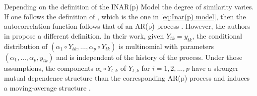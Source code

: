 Depending on the definition of the INAR(p) Model the degree of similarity varies. If one follows the definition of \cite{Guan:1991}, which is the one in \ref{eq:Inar(p) model}, then the autocorrelation function follows that of an AR(p) process \cite{Oliveira:2005}. However, the authors in \cite{Alzaid:1990} propose a different definition. In their work, given $Y_{tk}=y_{tk}$, the conditional distribution of $(\alpha_1 \circ Y_{tk}, \ldots, \alpha_p \circ Y_{tk})$ is multinomial with parameters $( \alpha_1,\ldots,\alpha_p,y_{tk})$ and is independent of the history of the process. Under those assumptions, the components $\alpha_i \circ Y_{t,k}$ of $Y_{t,k}$ for $i=1,2,\ldots,p$  have a stronger mutual dependence structure than the corresponding AR(p) process and induces a moving-average structure \cite{Alzaid:1990}.
